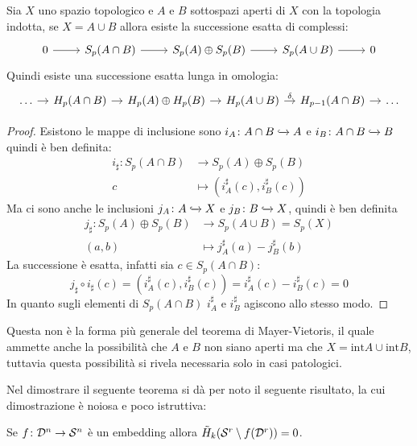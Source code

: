 \begin{theorem}
  Sia $ X $ uno spazio topologico e $ A $ e $ B $ sottospazi aperti di $ X $ con la
  topologia indotta, se $ X = A \cup B $ allora esiste la successione esatta di complessi:
  \[
    \begin{tikzcd}
      0 \rar & S_p(A \cap B) \rar & S_p(A) \oplus S_p(B) \rar & S_p(A \cup B) \rar & 0
    \end{tikzcd}
  \]
  Quindi esiste una successione esatta lunga in omologia:
  \[
    \begin{tikzcd}[nodes = {column sep = 10 pt}]
      \dots \rar & H_p(A \cap B) \rar & H_p(A) \oplus H_p(B) \rar & H_p(A \cup B) \rar{\delta} & H_{p-1}(A \cap B) \rar & \dots
    \end{tikzcd}
  \]
\end{theorem}
\begin{proof}
  Esistono le mappe di inclusione sono $ i_A \colon A \cap B \xhookrightarrow{} A $ e $ i_B \colon A \cap B \xhookrightarrow{} B $ quindi
  è ben definita:
  \begin{align*}
    i_\sharp \colon S_p(A \cap B) & \to S_p(A) \oplus S_p(B) \\
    c & \mapsto (i_A^\sharp (c), i_B^\sharp (c))
  \end{align*}
  Ma ci sono anche le inclusioni $ j_A \colon A \xhookrightarrow{} X $ e $ j_B \colon B \xhookrightarrow{} X $,
  quindi è ben definita
  \begin{align*}
    j_\sharp \colon  S_p(A) \oplus S_p(B) & \to S_p(A \cup B) = S_p(X) \\
    (a,b) &  \mapsto j_A^\sharp(a) - j_B^\sharp(b)
  \end{align*}
  La successione è esatta, infatti sia $ c \in S_p(A \cap B) $:
  \[
    j_\sharp \circ i_\sharp (c) = (i_A^\sharp (c), i_B^\sharp (c)) = i_A^\sharp (c) -  i_B^\sharp (c) = 0
  \]
  In quanto sugli elementi di $ S_p(A \cap B) $ $ i_A^\sharp $ e $ i_B^\sharp $ agiscono
  allo stesso modo.
\end{proof}

\begin{osservation}
  Questa non è la forma più generale del teorema di Mayer-Vietoris, il quale
  ammette anche la possibilità che $ A $ e $ B $ non siano aperti ma che
  $ X = \mathrm{int} A \cup \mathrm{int} B $, tuttavia questa possibilità si rivela
  necessaria solo in casi patologici.
\end{osservation}
Nel dimostrare il seguente teorema si dà per noto il seguente risultato, la cui
dimostrazione è noiosa e poco istruttiva:
\begin{lemma}
  Se $ f \colon \mathcal{D}^{n} \to \mathcal{S}^{n} $ è un embedding allora $ \tilde{H}_k(\mathcal{S}^{r} \setminus f(\mathcal{D}^{r})) = 0 $.
\end{lemma}


